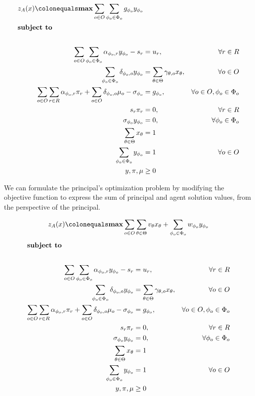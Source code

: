 \begin{align} 
    z_A(x) \colonequals \boldsymbol{\max}  \sum_{o \in O} \sum_{\phi_o \in \Phi_o} g_{\phi_o} y_{\phi_o} \\
    \shortintertext{\textbf{subject to} \nonumber} \\
    \sum_{o \in O} \sum_{\phi_o \in \Phi_o} \alpha_{\phi_o,r} y_{\phi_o}  - s_r  & = u_r, & \forall r \in R \\
    \sum_{\phi_o \in \Phi_o} \delta_{\phi_o,o} y_{\phi_o} & = \sum_{\theta \in \Theta} \gamma_{\theta,o} x_{\theta} , & \forall o \in O \\
    \sum_{o \in O} \sum_{r \in R} \alpha_{\phi_o,r} \pi_r + \sum_{o \in O} \delta_{\phi_o,o} \mu_o - \sigma_{\phi_o}  & = g_{\phi_o} , & \forall o \in O, \phi_o \in \Phi_o \\
    s_r \pi_r & = 0 , & \forall r \in R \\
    \sigma_{\phi_o} y_{\phi_o} & = 0 , & \forall \phi_o \in \Phi_o \\
    \sum_{\theta \in \Theta} x_\theta & = 1 \\
    \sum_{\phi_o \in \Phi_o} y_{\phi_o} & = 1 & \forall o \in O \\
    y, \pi, \mu & \geq 0 
\end{align}

We can formulate the principal's optimization problem by modifying the objective function to express the sum of principal and agent solution values, from the perspective of the principal.

\begin{equation} 
    z_A(x) \colonequals \boldsymbol{\max} \sum_{o \in O} \sum_{\theta \in \Theta} v_{\theta} x_{\theta} + \sum_{\phi_o \in \Phi_o} w_{\phi_o} y_{\phi_o} \\
\end{equation} 
\begin{align} 
    \shortintertext{\textbf{subject to} \nonumber} \\
    \sum_{o \in O} \sum_{\phi_o \in \Phi_o} \alpha_{\phi_o,r} y_{\phi_o}  - s_r  & = u_r, & \forall r \in R \\
    \sum_{\phi_o \in \Phi_o} \delta_{\phi_o,o} y_{\phi_o} & = \sum_{\theta \in \Theta} \gamma_{\theta,o} x_{\theta} , & \forall o \in O \\
    \sum_{o \in O} \sum_{r \in R} \alpha_{\phi_o,r} \pi_r + \sum_{o \in O} \delta_{\phi_o,o} \mu_o - \sigma_{\phi_o}  & = g_{\phi_o} , & \forall o \in O, \phi_o \in \Phi_o \\
    s_r \pi_r & = 0 , & \forall r \in R \\
    \sigma_{\phi_o} y_{\phi_o} & = 0 , & \forall \phi_o \in \Phi_o \\
    \sum_{\theta \in \Theta} x_\theta & = 1 \\
    \sum_{\phi_o \in \Phi_o} y_{\phi_o} & = 1 & \forall o \in O \\
    y, \pi, \mu & \geq 0 
\end{align}


